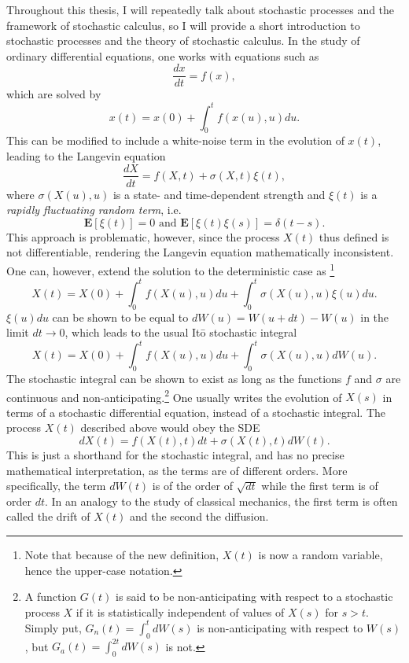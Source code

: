 Throughout this thesis, I will repeatedly talk about stochastic processes and the framework of stochastic calculus, so I will provide a short introduction to stochastic processes and
the theory of stochastic calculus. In the study of ordinary differential equations, one works with equations such as
\[
\frac{d x}{dt} = f(x),
\]
which are solved by
\[
x(t) = x(0) + \int_0^t f(x(u),u) du.
\]
This can be modified to include a white-noise term in the evolution of $x(t)$, leading to the Langevin equation
\[
\frac{d X}{dt} = f(X,t) + \sigma(X,t) \xi(t),
\]
where $\sigma(X(u),u)$ is a state- and time-dependent strength and $\xi(t)$ is a {\em rapidly fluctuating random term}, i.e.
$$\boldsymbol{E}[\xi(t)] = 0\textrm{ and }\boldsymbol{E}[\xi(t)\xi(s)] = \delta(t-s).
$$ 
This approach is 
problematic, however, since the process $X(t)$ thus defined is not differentiable, rendering the Langevin equation mathematically inconsistent. One can, however, extend the solution 
to the deterministic case as
\footnote{Note that because of the new definition, $X(t)$ is now a random variable, hence
the upper-case notation.}
\[
X(t) = X(0) + \int_0^t f(X(u),u) du + \int_0^t \sigma(X(u),u) \xi(u) du.
\]
$\xi(u)du$ can be shown to be equal to $dW(u) = W(u+dt)-W(u)$ in the limit $dt \to 0$, which leads to the usual It\=o stochastic integral
\[
X(t) = X(0) + \int_0^t f\left(X(u),u\right) du + \int_0^t \sigma\left(X(u),u\right) dW(u).
\]
The stochastic integral can be shown to exist as long as the functions $f$ and $\sigma$ are continuous and non-anticipating.\footnote{A function $G(t)$ is said to be non-anticipating 
with  respect to a stochastic process $X$ if it is statistically independent of values of $X(s)$ for $s>t$. Simply put, $G_n(t) = \int_0^t dW(s)$ is non-anticipating with respect to $W(s)$, but
$G_a(t) = \int_0^{2t} dW(s)$ is not.} One usually writes the evolution of $X(s)$ in terms of a stochastic differential equation, instead of a stochastic integral. The process $X(t)$ 
described above would obey the SDE
\[
dX(t) = f\left(X(t),t\right) dt + \sigma\left(X(t),t\right) dW(t).
\]
This is just a shorthand for the stochastic integral, and has no precise mathematical interpretation, as the terms are of different orders. More specifically, the term $dW(t)$ is of the 
order of $\sqrt{dt}$ while the first term is of order $dt$. In an analogy to the study of classical mechanics, the first term is often called the drift of $X(t)$ and the second the diffusion.
\par

